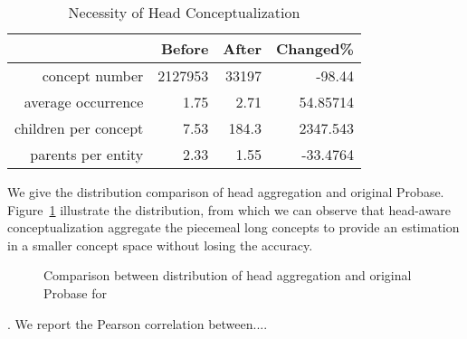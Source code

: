 \begin{table}[htbp]
  \centering
  \caption{Necessity of Head Conceptualization}
    \begin{tabular}{rrrr}
    \toprule
          & Before & After & Changed\% \\
    \midrule
    concept number & 2127953 & 33197 & -98.44 \\
    average occurrence & 1.75  & 2.71  & 54.85714 \\
    children per concept & 7.53  & 184.3 & 2347.543 \\
    parents per entity & 2.33  & 1.55  & -33.4764 \\
    \bottomrule
    \end{tabular}%
  \label{tab:nhc}%
\end{table}%


We give the distribution comparison of head aggregation and original Probase.
Figure~\ref{fig:hac} illustrate the distribution, from which we can observe that head-aware conceptualization aggregate the piecemeal long concepts to provide an estimation in a smaller concept space without losing the accuracy.


\begin{figure}[!htb]
\centering
{}
\caption{Comparison between distribution of head aggregation and original Probase for  }
\label{fig:hac}
\end{figure}


. We report the Pearson correlation between....


